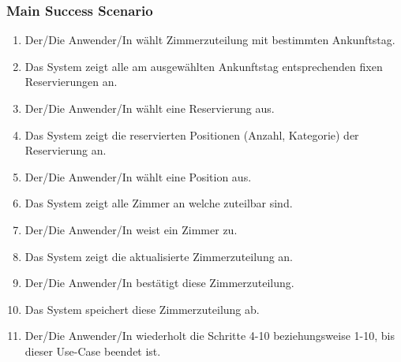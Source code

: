 \documentclass[./detailed_overview_usecases.tex]{subfiles}
\begin{document}
    \subsubsection*{Main Success Scenario}
    \begin{enumerate}
        \item Der/Die Anwender/In wählt Zimmerzuteilung mit bestimmten Ankunftstag.
        \item Das System zeigt alle am ausgewählten Ankunftstag entsprechenden fixen Reservierungen an.
        \item Der/Die Anwender/In wählt eine Reservierung aus.
        \item Das System zeigt die reservierten Positionen (Anzahl, Kategorie) der Reservierung an.
        \item Der/Die Anwender/In wählt eine Position aus.
        \item Das System zeigt alle Zimmer an welche zuteilbar sind.
        \item Der/Die Anwender/In weist ein Zimmer zu.
        \item Das System zeigt die aktualisierte Zimmerzuteilung an.
        \item Der/Die Anwender/In bestätigt diese Zimmerzuteilung.
        \item Das System speichert diese Zimmerzuteilung ab.
        \item Der/Die Anwender/In wiederholt die Schritte 4-10 beziehungsweise 1-10, bis dieser Use-Case beendet ist.
    \end{enumerate}
\end{document}
